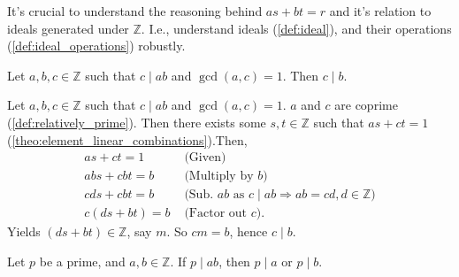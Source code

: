 \begin{Tip}
    It's crucial to understand the reasoning behind $as+bt=r$ and it's relation to ideals generated under $\mathbb{Z}$. I.e., understand ideals (\ref{def:ideal}), and their operations (\ref{def:ideal_operations}) robustly.
\end{Tip}

\newpage 

\begin{theo}

    \label{theo:cancellation_of_gcd}

    Let \( a, b, c \in \mathbb{Z} \) such that \( c \mid ab \) and \( \gcd(a, c) = 1 \). Then \( c \mid b \).
\end{theo}

\begin{Proof}

    Let $a,b,c\in\mathbb{Z}$ such that $c\mid ab$ and $\gcd(a,c)=1$. $a$ and $c$ are coprime (\ref{def:relatively_prime}). Then there exists some $s,t\in\mathbb{Z}$
    such that $as+ct=1$ (\ref{theo:element_linear_combinations}).Then, 
    \begin{align*}
        as+ct=1 & \text{ (Given)}\\
        abs + cbt = b & \text{ (Multiply by $b$)}\\
        cds + cbt = b & \text{ (Sub. $ab$ as $c\mid ab\Rightarrow ab = cd,d\in\mathbb{Z}$)}\\
        c(ds+bt)=b & \text{ (Factor out $c$).}
    \end{align*}
    Yields $(ds+bt)\in\mathbb{Z}$, say $m$. So $cm = b$, hence $c\mid b$.
\end{Proof}

\begin{theo}

    Let \( p \) be a prime, and \( a, b \in \mathbb{Z} \). If \( p \mid ab \), then \( p \mid a \) or \( p \mid b \).
\end{theo}

